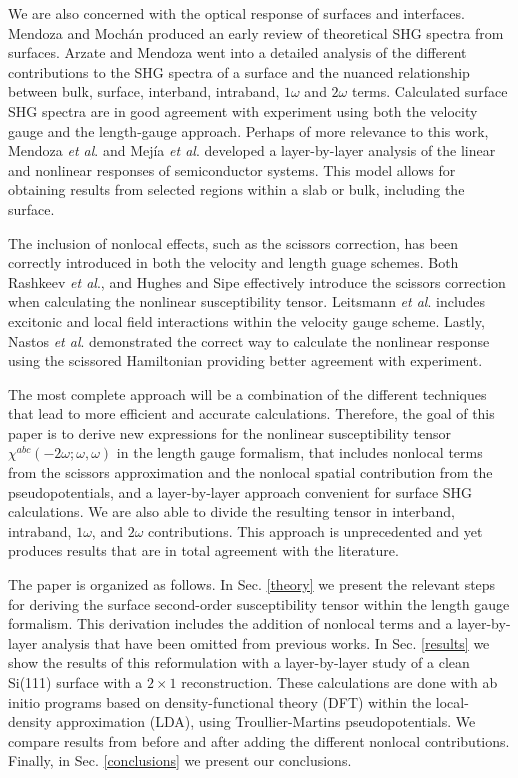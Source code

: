 We are also concerned with the optical response of surfaces and interfaces.
Mendoza and Moch\'an\cite{mendozaPRB96} produced an early review of 
theoretical SHG spectra from surfaces. Arzate and Mendoza\cite{arzatePRB01}
went into a detailed analysis of the different contributions to the SHG spectra
of a surface and the nuanced relationship between bulk, surface, interband, 
intraband, $1\omega$ and $2\omega$ terms. Calculated surface SHG spectra are 
in good agreement with experiment using both the velocity gauge
\cite{mendozaPRB01,mendozaPRL98,reiningPRB94} and the length-gauge 
approach\cite{sharmaPRB03}. Perhaps of more relevance to this 
work, Mendoza \emph{et al}.\cite{mendozaPRB06} and 
Mejía \emph{et al}.\cite{mejiaRMF04} developed a layer-by-layer analysis of 
the linear and nonlinear responses of semiconductor systems. This model
allows for obtaining results from selected regions within a slab or bulk,
including the surface.

The inclusion of nonlocal effects, such as the scissors correction, has been
correctly introduced in both the velocity and length guage schemes. Both 
Rashkeev \emph{et al}.,\cite{rashkeevPRB98} and Hughes and 
Sipe\cite{hughesPRB96} effectively introduce the scissors correction when 
calculating the nonlinear susceptibility tensor. Leitsmann 
\emph{et al}.\cite{leitsmannPRB05} includes excitonic and local field 
interactions within the velocity gauge scheme. 
Lastly, Nastos \emph{et al}.\cite{nastosPRB05} demonstrated the correct 
way to calculate the nonlinear response using the scissored Hamiltonian 
providing better agreement with experiment. 

The most complete approach will be a combination of the different techniques 
that lead to more efficient and accurate calculations. Therefore,
the goal of this paper is to derive new expressions for the nonlinear
susceptibility tensor $\chi^{abc}(-2\omega;\omega,\omega)$ in the length
gauge formalism, that includes nonlocal terms from the scissors approximation 
and the nonlocal spatial contribution from the pseudopotentials, and a 
layer-by-layer approach convenient for surface SHG calculations. We are also
able to divide the resulting tensor in interband, intraband, $1\omega$, and 
$2\omega$ contributions. This approach is unprecedented and yet produces 
results that are in total agreement with the literature.

The paper is organized as follows. In Sec. \ref{theory} we present the 
relevant steps for deriving the surface second-order susceptibility tensor 
within the length gauge formalism. This derivation includes the addition of 
nonlocal terms and a layer-by-layer analysis that have been omitted 
from previous works. In Sec. \ref{results} we show the results of this 
reformulation with a layer-by-layer study of a clean Si(111) surface with a 
$2 \times 1$ reconstruction. These calculations are done with ab initio 
programs based on density-functional theory (DFT) within the local-density 
approximation (LDA), using Troullier-Martins pseudopotentials. We compare 
results from before and after adding the different nonlocal contributions.
Finally, in Sec. \ref{conclusions} we present our conclusions.
